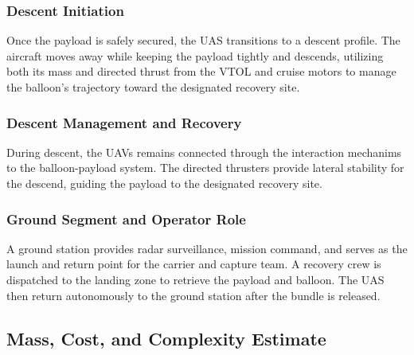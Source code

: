 \subsubsection{Descent Initiation}

Once the payload is safely secured, the UAS transitions to a descent profile. The
aircraft moves away while keeping the payload tightly and descends, utilizing both its mass and
directed thrust from the VTOL and cruise motors to manage the balloon’s trajectory toward the
designated recovery site.

\subsubsection{Descent Management and Recovery}

During descent, the UAVs remains connected through the interaction mechanims to the balloon-payload system. The directed thrusters provide lateral stability for the descend, guiding the payload to the designated recovery site.

\subsubsection{Ground Segment and Operator Role}

A ground station provides radar surveillance, mission command, and serves as the launch and return point for the carrier and capture team. A recovery crew is dispatched to the  landing zone to retrieve the payload and balloon. The UAS then return autonomously to the ground station after the bundle is released.


\subsection{Mass, Cost, and Complexity Estimate}

